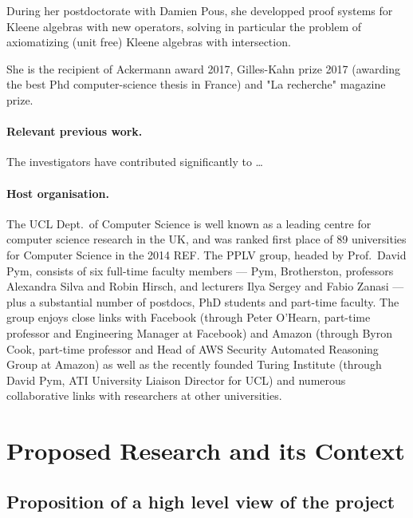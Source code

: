 \documentclass[11pt,twocolumn]{article}
\begin{document}
During her postdoctorate with Damien Pous, she developped proof systems for Kleene algebras with new operators, solving in particular the problem of axiomatizing (unit free) Kleene algebras with intersection.

She is the recipient of Ackermann award 2017, Gilles-Kahn prize 2017 (awarding the best Phd computer-science thesis  in France) and "La recherche" magazine prize. 
\paragraph{Relevant previous work.}
The investigators have contributed significantly to \ldots

\paragraph{Host organisation.}
The UCL Dept.\ of Computer Science is well known as a leading centre for computer science research in the UK, and was ranked first place of 89 universities for Computer Science in the 2014 REF. The PPLV group, headed by Prof.\ David Pym, consists of six full-time faculty members --- Pym, Brotherston, professors Alexandra Silva and Robin Hirsch, and lecturers Ilya Sergey and Fabio Zanasi --- plus a substantial number of postdocs, PhD students and part-time faculty. The group enjoys close links with Facebook (through Peter O'Hearn, part-time professor and Engineering Manager at Facebook) and Amazon (through Byron Cook, part-time professor and Head of AWS Security Automated Reasoning Group at Amazon) as well as the recently founded Turing Institute (through David Pym, ATI University Liaison Director for UCL) and numerous collaborative links with researchers at other universities.

\begingroup
\footnotesize
{}
\endgroup


%

\newpage

\section{Proposed Research and its Context}

\subsection{Proposition of a high level view of the project}
\end{document}
